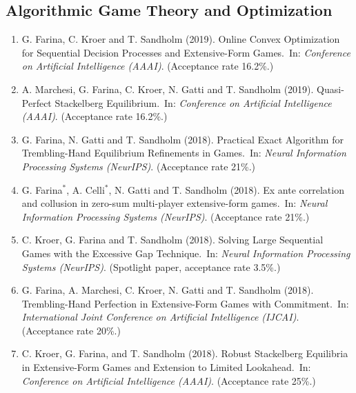 \documentclass[10PT,letter]{article}
\newcounter{papercnt}
\newcommand{\equalcontrib}{$^*$}
\newcommand{\subsectionstyle}[1]{\normalfont\selectfont\textcolor{titlecol}{\sffamily #1}}
\newcommand{\newl}{~}
\begin{document}
        \subsection*{\subsectionstyle{Algorithmic Game Theory and Optimization}}
        \begin{enumerate}[itemsep=.5mm]
            \setcounter{enumi}{\value{papercnt}}

            \item G. Farina, C. Kroer and T. Sandholm (2019). Online Convex Optimization for Sequential Decision Processes and Extensive-Form Games.\newl In: \textit{Conference on Artificial Intelligence (AAAI)}. (Acceptance rate 16.2\%.)
            
           \item A. Marchesi, G. Farina, C. Kroer, N. Gatti and T. Sandholm (2019). Quasi-Perfect Stackelberg Equilibrium.\newl In: \textit{Conference on Artificial Intelligence (AAAI)}. (Acceptance rate 16.2\%.)

            \item G. Farina, N. Gatti and T. Sandholm (2018). Practical Exact Algorithm for Trembling-Hand Equilibrium Refinements in Games.\newl In: \emph{Neural Information Processing Systems (NeurIPS)}. (Acceptance rate 21\%.)
            

            \item G. Farina\equalcontrib{}, A. Celli\equalcontrib{}, N. Gatti and T. Sandholm (2018). Ex ante correlation and collusion in zero-sum multi-player extensive-form games.\newl In: \emph{Neural Information Processing Systems (NeurIPS)}. (Acceptance rate 21\%.)
            
            \item C. Kroer, G. Farina and T. Sandholm (2018). Solving Large Sequential Games with the Excessive Gap Technique.\newl In: \emph{Neural Information Processing Systems (NeurIPS)}. (Spotlight paper, acceptance rate 3.5\%.)
            
            \item G. Farina, A. Marchesi, C. Kroer, N. Gatti and T. Sandholm (2018). Trembling-Hand Perfection in Extensive-Form Games with Commitment.\newl In: \textit{International Joint Conference on Artificial Intelligence (IJCAI)}. (Acceptance rate 20\%.)

            \item C. Kroer, G. Farina, and T. Sandholm (2018). Robust Stackelberg Equilibria in Extensive-Form Games and Extension to Limited Lookahead.\newl In: \textit{Conference on Artificial Intelligence (AAAI)}. (Acceptance rate 25\%.)
            

\end{enumerate}
\end{document}
